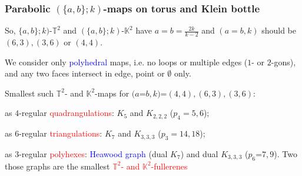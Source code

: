 \documentclass{beamer}
\begin{document}
\begin{frame}\frametitle{Parabolic $(\{a,b\};k)$-maps on torus and Klein bottle}
\vspace{-1.5mm}











So, $\{a,b\};k)$-$\mathbb{T}^2$ and $(\{a,b\};k)$-$\mathbb{K}^2$ 
have
$a=b=\frac{2k}{k-2}$ 
and $(a=b,k)$ should be $(6,3),(3,6)$ or $(4,4)$.
\vspace{1mm}

We consider only \textcolor{blue}{polyhedral} maps, i.e.
 no loops or multiple edges ($1$- or $2$-gons), and  any two faces 
intersect
 in edge, point  or $\emptyset$ only.
\vspace{1mm}

Smallest  such $\mathbb{T}^2$- and $\mathbb{K}^2$-maps for 
$(a$=$b,k)$=$(4,4),(6,3),(3,6)$:
\vspace{1mm}

as $4$-regular   \textcolor{red}{quadrangulations}:
$K_5$ and
$K_{2,2,2}$ ($p_4=5,6$);



as $6$-regular  \textcolor{red}{triangulations}:  $K_7$ and $K_{3,3,3}$ ($p_3=14,18$);

as $3$-regular  \textcolor{red}{polyhexes}:
\textcolor{blue}{Heawood graph} (dual $K_7$) and dual $K_{3,3,3}$ ($p_6$=$7,9$).
Two those graphs are the smallest \textcolor{red}{$\mathbb{T}^2$- and $\mathbb{K}^2$-fullerenes}


\vspace{1mm}



\end{frame}   
\end{document}
